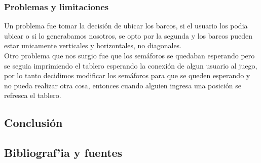 \documentclass[10pt,a4paper]{article}
\begin{document}
	\subsubsection{Problemas y limitaciones}
		Un problema fue tomar la decisi\'on de ubicar los barcos, si el usuario los podia ubicar o si lo generabamos nosotros, se opto por la segunda y los barcos pueden estar unicamente verticales y horizontales, no diagonales. \\
		Otro problema que nos surgio fue que los sem\'aforos se quedaban esperando pero se seguia imprimiendo el tablero esperando la conexi\'on de algun usuario al juego, por lo tanto decidimos modificar los sem\'aforos para que se queden esperando y no pueda realizar otra cosa, entonces cuando alguien ingresa una posici\'on se refresca el tablero.  

\subsection{Conclusi\'on}

\subsection{Bibliograf'ia y fuentes}
\end{document}
